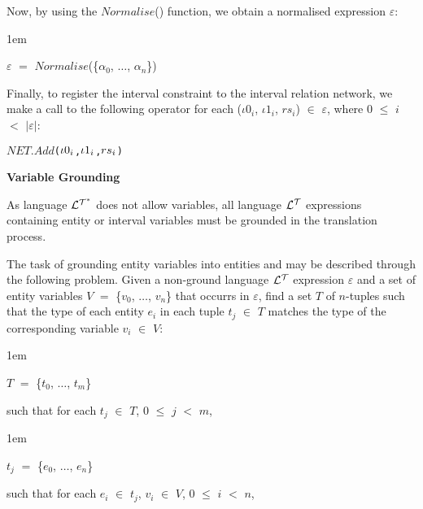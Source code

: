 \documentclass[11pt]{report}
\newenvironment{vverbatim}
{
  \begin{alltt}
}
{
  \vspace{-\baselineskip}
  \end{alltt}
}
\newenvironment{vquote}
{
  \begin{list}{}{\leftmargin 1em}\item[]
}
{
  \end{list}
}
\begin{document}
\begin{itemize}
              Now, by using the $Normalise$() function, we obtain a normalised
              expression $\varepsilon$:

              \begin{vquote}
                $\varepsilon$ $=$
                  $Normalise$(\{${\alpha}_0$, $\ldots$, ${\alpha}_n$\})
              \end{vquote}

              Finally, to register the interval constraint to the interval
              relation network, we make a call to the following operator
              for each (${\iota}0_i$, ${\iota}1_i$, $rs_i$) $\in$
              $\varepsilon$, where $0$ $\leq$ $i$ $<$ $|\varepsilon|$:

              \begin{vverbatim}
  \(NET.Add\)(\({\iota}0\sb{i}\), \({\iota}1\sb{i}\), \(rs\sb{i}\))
              \end{vverbatim}

            \item
              {\bf Variable Grounding}

              As language ${\cal L^{T^*}}$ does not allow variables, all
	      language ${\cal L^T}$ expressions containing entity or interval
              variables must be grounded in the translation process.
            
	      The task of grounding entity variables into entities and may be
              described through the following problem. Given a non-ground
	      language ${\cal L^T}$ expression $\varepsilon$ and a set of
              entity variables $V$ $=$ \{$v_0$, $\ldots$, $v_n$\} that occurrs
              in $\varepsilon$, find a set $T$ of $n$-tuples such that the type
              of each entity $e_i$ in each tuple $t_j$ $\in$ $T$ matches the
              type of the corresponding variable $v_i$ $\in$ $V$:

              \begin{vquote}
                $T$ $=$ \{$t_0$, $\ldots$, $t_m$\}
              \end{vquote}

              \noindent
              such that for each $t_j$ $\in$ $T$, $0$ $\leq$ $j$ $<$ $m$,

              \begin{vquote}
                $t_j$ $=$ \{$e_0$, $\ldots$, $e_n$\}
              \end{vquote}

              \noindent
              such that for each $e_i$ $\in$ $t_j$, $v_i$ $\in$ $V$,
              $0$ $\leq$ $i$ $<$ $n$,


\end{itemize}
\end{document}
